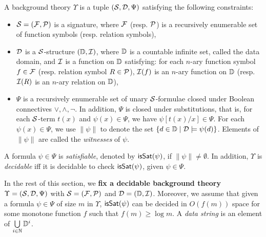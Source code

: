 \begin{definition}
A background theory  $\Upsilon$ is a tuple $(\mathcal{S}, \mathcal{D}, \Psi)$ satisfying the following constraints:
\begin{itemize}
\item $\mathcal{S}=({\mathcal{F}}, {\mathcal{P}})$ is a signature, where ${\mathcal{F}}$ (resp. ${\mathcal{P}}$) is a recursively enumerable set of function symbols (resp. relation symbols), 
%

\item $\mathcal{D}$ is a $\mathcal{S}$-structure $(\mathbb{D}, \mathcal{I})$, where $\mathbb{D}$ is a countable infinite set, called the data domain, 
and $\mathcal{I}$ is a function on $\mathbb{D}$ satisfying: for each $n$-ary function symbol $f \in {\mathcal{F}}$ (resp. relation symbol $R \in {\mathcal{P}}$), $\mathcal{I}(f)$ is an $n$-ary function on $\mathbb{D}$ (resp. $\mathcal{I}(R)$ is an $n$-ary relation on $\mathbb{D}$),
%
\item $\Psi$ is a recursively enumerable set of unary $\mathcal{S}$-formulae closed under Boolean connectives $\vee, \wedge, \neg$. In addition, $\Psi$ is closed under substitutions, that is, for each $\mathcal{S}$-term $t(x)$ and $\psi(x) \in \Psi$, we have $\psi[t(x)/x] \in \Psi$.
For each $\psi(x) \in \Psi$, we use $\|\psi\|$ to denote the set $\{d \in \mathbb{D} \mid  \mathcal{D} \models \psi(d)\}$. Elements of $\| \psi\|$ are called the \emph{witnesses} of $\psi$.
\end{itemize}
A formula $\psi \in \Psi$ is \emph{satisfiable}, denoted by $\mathsf{isSat}(\psi)$, if $\|\psi\| \neq \emptyset$. In addition, $\Upsilon$ is \emph{decidable} iff it is decidable to check $\mathsf{isSat}(\psi)$, given $\psi \in\Psi$.
\end{definition}

In the rest of this section, we {\bf fix a decidable background theory} $\Upsilon=(\mathcal{S}, \mathcal{D}, \Psi)$ with $\mathcal{S}=({\mathcal{F}}, {\mathcal{P}})$ and $\mathcal{D} = (\mathbb{D}, \mathcal{I})$. Moreover, we assume that given a formula $\psi \in \Psi$ of size $m$ in $\Upsilon$, $\mathsf{isSat}(\psi)$ can be decided in $O(f(m))$ space for some monotone function $f$ such that $f(m) \ge \log m$.
%
%
A \emph{data string} is an element of $\bigcup \limits_{i \in \mathbb{N}} \mathbb{D}^i$.

